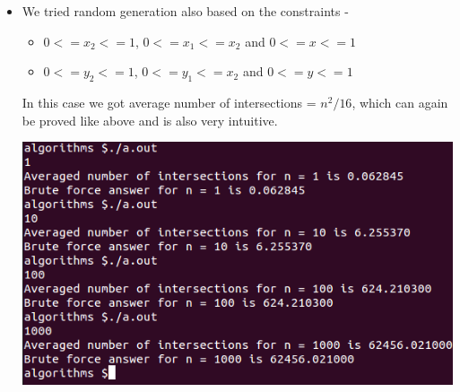 \documentclass{article}
\begin{document}
\begin{itemize}
\subsubsection{Bonus Question Proof}
From our uniform generation we have that ($0<=x_1<=1$), ($0<=x_2<=1$), ($0<=y_1<=1$), ($0<=y_2<=1$), ($0<=x<=1$) and ($0<=y<=1$) are random variables with probability distribution function as $1$ in $[0,1]$ and 0 otherwise. Therefore, the probability of $x$ lying between $[x_1,x_2]$ will be (taking $x_1<=x_2$) -
\begin{center}
$\int_{0}^{1} {$\int_{x_1}^{1} {$\int_{x}^{1} 1 * dx_2 $} * dx * $} dx_1$
= 1/6
\end{center}
Similarly for $x_1>=x_2$ it will be $1/6$. Implying overall probability of $x$ lying between $x_1$ and $x_2$ is $1/3$. \\*
Blue and Red line segments will intersect when 
\begin{center}
$x$ lies between $x_1$ and $x_2$ \\*
and \\*
$y$ lies between $y_1$ and $y_2$ \\*
\end{center}
Implies probability of one blue and one red line segment intersection is -
\begin{center}
= $1/3 * 1/3 = 1/9$ \\*
As $x$ and $y$ are independent random variables here.
\end{center}
There are $n^2$ pairs of $(red,blue)$ line segments. Implying on an average when $n$ is pretty large, the number of intersections should be
\begin{center}
 = $n^2 * 1/9$ \\*
 = $n^2/9$
\end{center} 
\item  We tried random generation also based on the constraints - 
\begin{itemize}
\item $0<=x_2<=1$, $0<=x_1<=x_2$ and $0<=x<=1$
\item $0<=y_2<=1$, $0<=y_1<=x_2$ and $0<=y<=1$
\end{itemize}
In this case we got average number of intersections = $n^2/16$, which can again be proved like above and is also very intuitive.
\begin{center}
\includegraphics[scale=0.5]{out.png}

\end{center}
\end{itemize}
\end{document}
